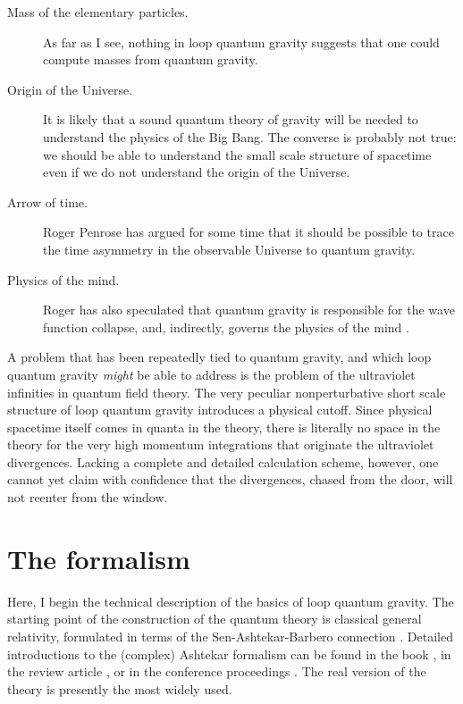 \documentclass[12pt]{article}
\begin{document}
\begin{description}
	\item[Mass of the elementary particles.]  As far as I see, 
	nothing in loop quantum gravity suggests that one could compute 
	masses from quantum gravity. 

	\item[Origin of the Universe.]  It is likely that a sound 
	quantum theory of gravity will be needed to understand the 
	physics of the Big Bang.  The converse is probably not true: 
	we should be able to understand the small scale structure of 
	spacetime even if we do not understand the origin of the 
	Universe.

	\item[Arrow of time.] Roger Penrose has argued for some time 
	that it should be possible to trace the time asymmetry in the 
	observable Universe to quantum gravity. 

	\item[Physics of the mind.]  Roger has also speculated 
	that quantum gravity is responsible for the wave function 
	collapse, and, indirectly, governs the physics of the mind 
	\cite{PenroseBook}. 
		  
\end{description}

A problem that has been repeatedly tied to quantum gravity, and 
which loop quantum gravity {\em might\/} be able to address is 
the problem of the ultraviolet infinities in quantum field 
theory.  The very peculiar nonperturbative short scale structure 
of loop quantum gravity introduces a physical cutoff.  Since 
physical spacetime itself comes in quanta in the theory, there is 
literally no space in the theory for the very high momentum 
integrations that originate the ultraviolet divergences.  Lacking 
a complete and detailed calculation scheme, however, one cannot 
yet claim with confidence that the divergences, chased from the 
door, will not reenter from the window.

\section{The formalism}\label{5}  

Here, I begin the technical description of the basics of loop 
quantum gravity.  The starting point of the construction of the 
quantum theory is classical general relativity, formulated in 
terms of the Sen-Ashtekar-Barbero connection 
\cite{Sen,Ashtekar86,Barbero3}.  Detailed introductions to the 
(complex) Ashtekar formalism can be found in the book 
\cite{AshtekarBook}, in the review article \cite{Rovelli91}, or 
in the conference proceedings \cite{Ehlers94}.  The real version 
of the theory is presently the most widely used.
\end{document}
